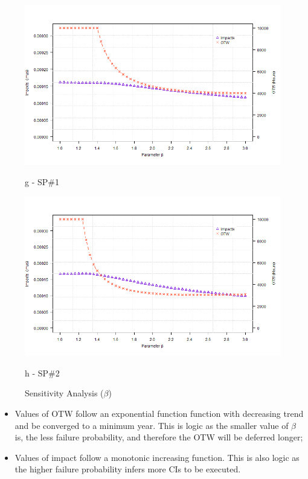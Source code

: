 \begin{figure}[!htb]
	\hspace{0.05cm}
	\begin{minipage}[b]{0.5\linewidth}
		\centering
		\includegraphics[width=\textwidth]{figures/ch05_fig_betasa_pump5}
		\caption*{g -  SP\#1}
	\end{minipage}
	\hspace{0.05cm}
	\begin{minipage}[b]{0.5\linewidth}
		\centering
		\includegraphics[width=\textwidth]{figures/ch05_fig_betasa_pump6}
		\caption*{h - SP\#2}
	\end{minipage}
	\caption{Sensitivity Analysis ($\beta$)}
	\label{ch05_fig_sa_m}
\end{figure}

\begin{itemize}
	\item Values of OTW follow an exponential function function with decreasing trend and be converged to a minimum year. This is logic as the smaller value of $\beta$ is, the less failure probability, and therefore the OTW will be deferred longer;
	\item Values of impact follow a monotonic increasing function. This is also logic as the higher failure probability infers more CIs to be executed.
\end{itemize}

